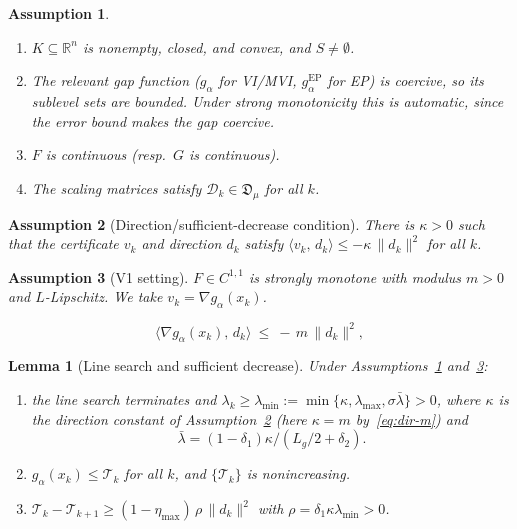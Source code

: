\documentclass[10pt,a4paper]{amsart}
\newtheorem{as}{Assumption}
\newtheorem{lemma}{Lemma}
\newcommand{\Dfam}{\mathfrak{D}}     %
\newcommand{\Dm}{\mathcal{D}}        %
\newcommand{\R}{\mathbb{R}}
\newcommand{\Sol}{S}                 %
\newcommand{\inner}[2]{\langle #1,\, #2\rangle}
\newcommand{\norm}[1]{\lVert #1 \rVert}
\begin{document}
\begin{as}\label{as:standing}
\begin{enumerate}[label=(\roman*),leftmargin=2em]
  \item $K\subseteq\R^n$ is nonempty, closed, and convex, and $\Sol\neq\emptyset$.
  \item The relevant gap function ($g_\alpha$ for VI/MVI, $g_\alpha^{\mathrm{EP}}$ for EP) is coercive, so
  its sublevel sets are bounded. Under strong monotonicity this is automatic, since the error bound makes
  the gap coercive.
  \item $F$ is continuous (resp.\ $G$ is continuous).
  \item The scaling matrices satisfy $\Dm_k\in\Dfam_\mu$ for all $k$.
\end{enumerate}
\end{as}

\begin{as}[Direction/sufficient-decrease condition]\label{as:dir}
There is $\kappa>0$ such that the certificate $v_k$ and direction $d_k$ satisfy
$\inner{v_k}{d_k}\le -\kappa\,\norm{d_k}^2$ for all $k$.
\end{as}

\begin{as}[V1 setting]\label{as:v1}
$F\in C^{1,1}$ is strongly monotone with modulus $m>0$ and $L$-Lipschitz. We take
$v_k=\nabla g_\alpha(x_k)$.
\end{as}

\begin{equation}\label{eq:dir-m}
  \inner{\nabla g_\alpha(x_k)}{d_k}\ \le\ -\,m\,\norm{d_k}^2 ,
\end{equation}

\begin{lemma}[Line search and sufficient decrease]\label{lem:descent}
Under Assumptions~\ref{as:standing} and~\ref{as:v1}:
\begin{enumerate}[label=(\roman*),leftmargin=2em]
  \item the line search terminates and
  $\lambda_k\ge\lambda_{\min}:=\min\{\kappa,\lambda_{\max},\sigma\bar\lambda\}>0$, where $\kappa$ is the
  direction constant of Assumption~\ref{as:dir} (here $\kappa=m$ by~\eqref{eq:dir-m}) and
  \[
  \bar\lambda=(1-\delta_1)\kappa/(L_g/2+\delta_2).
  \]
  \item $g_\alpha(x_k)\le\mathcal T_k$ for all $k$, and $\{\mathcal T_k\}$ is nonincreasing.
  \item $\mathcal T_k-\mathcal T_{k+1}\ge (1-\eta_{\max})\,\rho\,\norm{d_k}^2$ with
  $\rho=\delta_1\kappa\lambda_{\min}>0$.
\end{enumerate}
\end{lemma}
\end{document}
